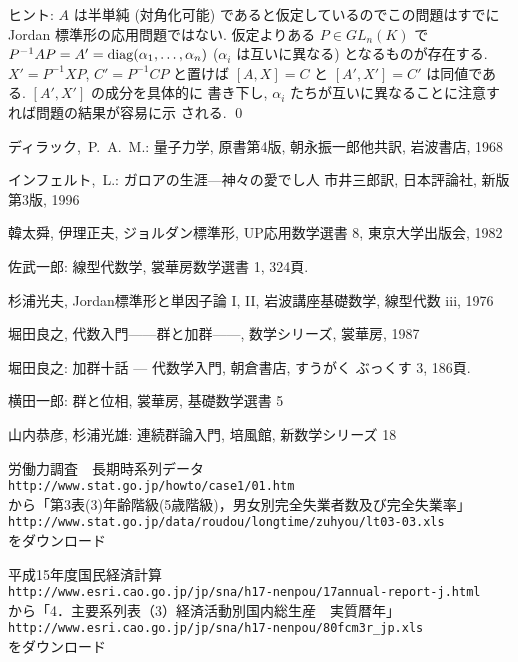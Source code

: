 \documentclass[12pt,twoside]{jarticle}
\begin{document}
\noindent
ヒント: $A$ は半単純 (対角化可能) であると仮定しているのでこの問題はすでに 
Jordan 標準形の応用問題ではない.  仮定よりある $P\in GL_n(K)$ 
で $P^{-1}AP=A'=\mathop{\mathrm{diag}}\nolimits(\alpha_1,\dots,\alpha_n)$ ($\alpha_i$ は互いに異なる) 
となるものが存在する.  $X'=P^{-1}XP$, $C'=P^{-1}CP$ と置けば $[A,X]=C$ 
と $[A',X']=C'$ は同値である.  $[A',X']$ の成分を具体的に
書き下し, $\alpha_i$ たちが互いに異なることに注意すれば問題の結果が容易に示
される.
\qed


\begin{thebibliography}{ABC}

ディラック,~P.~A.~M.:
量子力学, 原書第4版,
朝永振一郎他共訳, 
岩波書店, 1968

インフェルト,~L.:
ガロアの生涯—神々の愛でし人
市井三郎訳, 
日本評論社, 新版第3版, 1996


韓太舜, 伊理正夫, ジョルダン標準形, UP応用数学選書 8, 東京大学出版会, 1982

 佐武一郎: 線型代数学, 裳華房数学選書 1, 324頁.

杉浦光夫, Jordan標準形と単因子論 I, II, 岩波講座基礎数学, 線型代数 iii, 1976


堀田良之, 代数入門——群と加群——, 数学シリーズ, 裳華房, 1987

 堀田良之: 加群十話 --- 代数学入門, 朝倉書店, すうがく
ぶっくす 3, 186頁.


横田一郎: 群と位相, 裳華房, 基礎数学選書 5

山内恭彦, 杉浦光雄: 連続群論入門, 培風館, 新数学シリーズ 18

労働力調査　長期時系列データ \\
{\tt http://www.stat.go.jp/howto/case1/01.htm} \\
から「第3表(3)年齢階級(5歳階級)，男女別完全失業者数及び完全失業率」 \\
{\tt http://www.stat.go.jp/data/roudou/longtime/zuhyou/lt03-03.xls} \\
をダウンロード

平成15年度国民経済計算 \\
{\tt http://www.esri.cao.go.jp/jp/sna/h17-nenpou/17annual-report-j.html} \\
から「4．主要系列表（3）経済活動別国内総生産　実質暦年」\\
{\tt http://www.esri.cao.go.jp/jp/sna/h17-nenpou/80fcm3r\verb,_,jp.xls} \\
をダウンロード

\end{thebibliography}

\end{document}

